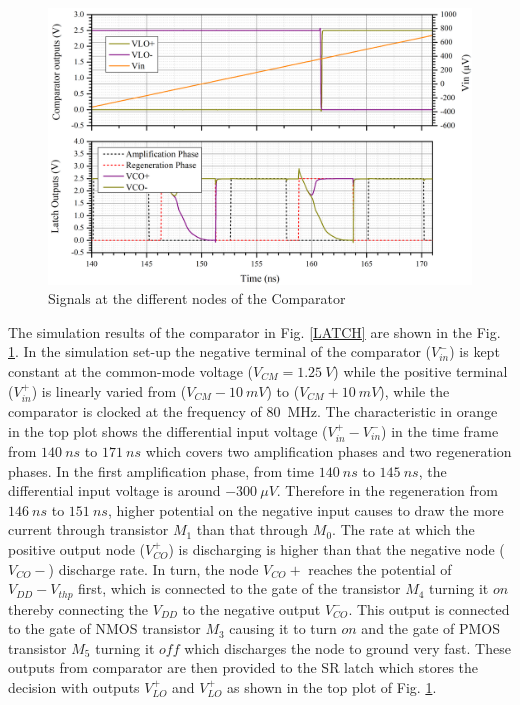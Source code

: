 \begin{figure}[h!]
\centering
\includegraphics[width=\columnwidth]{Chap05/Figures/comparator_signals.png}
\caption{Signals at the different nodes of the Comparator}
\label{fig:comp_sigs}
\end{figure}
The simulation results of the comparator in Fig. \ref{LATCH} are shown in the Fig. \ref{fig:comp_sigs}. In the simulation set-up the negative terminal of the comparator ($V_{in}^-$) is kept constant at the common-mode voltage ($V_{CM}=1.25~V$) while the positive terminal ($V_{in}^+$) is linearly varied from ($V_{CM}-10~mV$) to ($V_{CM}+10~mV$), while the comparator is clocked at the frequency of 80~MHz. The characteristic in orange in the top plot shows the differential input voltage ($V_{in}^+-V_{in}^-$) in the time frame from $140~ns$ to $171~ns$ which covers two amplification phases and two regeneration phases. In the first amplification phase, from time $140~ns$ to $145~ns$, the differential input voltage is around $-300~\mu V$. Therefore in the regeneration from $146~ns$ to $151~ns$, higher potential on the negative input causes to draw the more current through transistor $M_1$ than that through $M_0$. The rate at which the positive output node ($V_{CO}^+$) is discharging is higher than that the negative node ($V_{CO}-$) discharge rate. In turn, the node $V_{CO}+$ reaches the potential of $V_{DD}-V_{thp}$ first, which is connected to the gate of the transistor $M_4$ turning it $on$ thereby connecting the $V_{DD}$ to the negative output $V_{CO}^-$. This output is connected to the gate of NMOS transistor $M_3$ causing it to turn $on$ and the gate of PMOS transistor $M_5$ turning it $off$ which discharges the node to ground very fast. These outputs from comparator are then provided to the SR latch which stores the decision with outputs $V_{LO}^+$ and $V_{LO}^+$ as shown in the top plot of Fig. \ref{fig:comp_sigs}.

